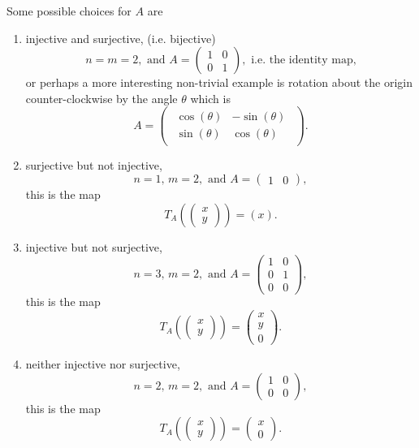 \documentclass[oneside,10pt]{amsart}
\newcounter{pass}
\begin{document}
\begin{enumerate}
\begin{solution}
Some possible choices for $A$ are
\begin{enumerate}
\item
injective and surjective, (i.e. bijective)
$$n=m=2, \text{ and } A = \begin{pmatrix} 1 & 0 \\0 & 1 \end{pmatrix}, \text{ i.e. the identity map,}$$
or perhaps a more interesting non-trivial example is rotation about the origin counter-clockwise by the angle $\theta$ which is
$$A = \begin{pmatrix}\begin{array}{lr} \cos(\theta) & -\sin(\theta) \\ \sin(\theta) & \cos(\theta) \end{array}\end{pmatrix}.$$
\item
surjective but not injective,
$$n=1, \, m=2 , \text{ and } A= \begin{pmatrix}1&0\end{pmatrix},$$
this is the map
$$T_A \left ( \begin{pmatrix} x \\ y\end{pmatrix} \right ) = (x).$$
\item
injective but not surjective,
$$n=3, \, m=2, \text{ and } A= \begin{pmatrix}1&0\\0&1\\0&0\end{pmatrix},$$
this is the map
$$T_A \left ( \begin{pmatrix} x \\ y\end{pmatrix} \right ) = \begin{pmatrix} x \\ y\\ 0\end{pmatrix}.$$
\item
neither injective nor surjective,
$$n=2, \, m=2, \text{ and } A= \begin{pmatrix}1&0\\0&0\end{pmatrix},$$
this is the map
$$T_A \left ( \begin{pmatrix} x \\ y\end{pmatrix} \right ) = \begin{pmatrix} x \\ 0\end{pmatrix}.$$
\end{enumerate}

\end{solution}
\setcounter{pass}{\value{enumi}}
\end{enumerate}
\end{document}
